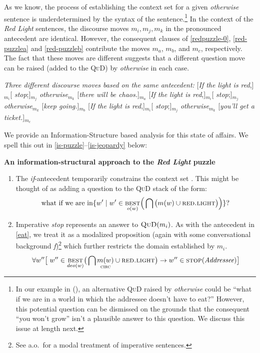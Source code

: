 As we know, the process of establishing the context set for a given \textit{otherwise} sentence is underdetermined by the syntax of the sentence.\footnote{In our example in (\lastx), an alternative \textsc{QuD} raised by \textit{otherwise} could be ``what if we are in a world in which the addressee doesn't have to eat?'' However, this potential question can be dismissed on the grounds that the consequent ``you won't grow'' isn't a plausible answer to this question. We discuss this issue at length next.} In the context of the \textit{Red Light} sentences, the discourse moves $ m_i,m_j,m_k $ in the pronounced antecedent are identical. However, the consequent clauses of \ref{redpuzzle-0}, \ref{red-puzzlea} and \ref{red-puzzleb} contribute the moves $m_a$, $m_b$, and $m_c$, respectively. The fact that these moves are different suggests that a different question move can be raised (added to the \textsc{QuD)} by \textit{otherwise} in each case.

\pex \textit{Three different discourse moves based on the same antecedent:}\label{red-puzzle} 
\a \label{redpuzzle-0} [\textit{If the light is red},]$_{m_i}$[ \textit{stop};]$_{m_{j}}$ \textit{otherwise}$ _{m_k} $ [\textit{there will be chaos.}]$_{m_{a}}$ 
\a  \label{red-puzzlea}[\textit{If the light is red},]$_{m_i}$[ \textit{stop};]$_{m_{j}}$ \textit{otherwise}$ _{m_k} $ [\textit{keep going.}]$_{m_{b}}$ 
\a  \label{red-puzzleb}[\textit{If the light is red},]$_{m_i}$[ \textit{stop};]$_{m_{j}}$ \textit{otherwise}$ _{m_k} $ [\textit{you'll get a ticket.}]$_{m_{c}}$ \xe

We provide an Information-Structure based analysis for this state of affairs. We spell this out in \ref{is-puzzle}--\ref{is-jeopardy} below:  

\pex \textbf{An information-structural approach to the \textit{Red Light }puzzle}\label{is-puzzle}
\begin{enumerate}
	\item[ {  \makebox[2em][l]{$ m_i $}} ] The \textit{if}-antecedent temporarily constrains the context set \citep[687]{Roberts1989}. This might be thought of as adding a question to the \textsc{QuD} stack of the form: $$ \text{what if we are in} \{w'\mid w'\in\underset{o(w)}{\textsc{best}}\Big(\bigcap\big(m(w)\cup\textsc{red.light}\big)\Big)\}? $$
	\item[ {  \makebox[2em][l]{$ m_j $}} ] Imperative \textit{stop} represents an answer to $ \textsc{QuD}(m_i)$. As with the antecedent in \ref{eat}, we treat it as a modalized proposition (again with some conversational background \textit{f})\footnote{See \citet{Portner2007} a.o.\ for a modal treatment of imperative sentences.} which further restricts the domain established by $ m_i $.\\
	$$\forall w''\big[\hspace{3pt} w''\in\underset{deo(w)}{\textsc{best}}\big(\bigcap\underset{\textsc{circ}}{m(w)}\cup\textsc{red.light}\big)\to w''\in\textsc{stop}(\textit{Addressee})\big]$$
\end{enumerate}\xe


